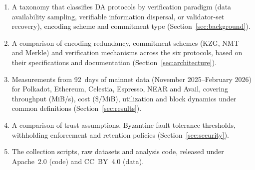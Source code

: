 \begin{enumerate}
    \item A taxonomy that classifies DA protocols by verification paradigm (data availability sampling, verifiable information dispersal, or validator-set recovery), encoding scheme and commitment type (Section~\ref{sec:background}).

    \item A comparison of encoding redundancy, commitment schemes (KZG, NMT and Merkle) and verification mechanisms across the six protocols, based on their specifications and documentation (Section~\ref{sec:architecture}).

    \item Measurements from 92~days of mainnet data (November 2025--February 2026) for Polkadot, Ethereum, Celestia, Espresso, NEAR and Avail, covering throughput (MiB/s), cost (\$/MiB), utilization and block dynamics under common definitions (Section~\ref{sec:results}).

    \item A comparison of trust assumptions, Byzantine fault tolerance thresholds, withholding enforcement and retention policies (Section~\ref{sec:security}).

    \item The collection scripts, raw datasets and analysis code, released under Apache~2.0 (code) and CC~BY~4.0 (data).
\end{enumerate}
